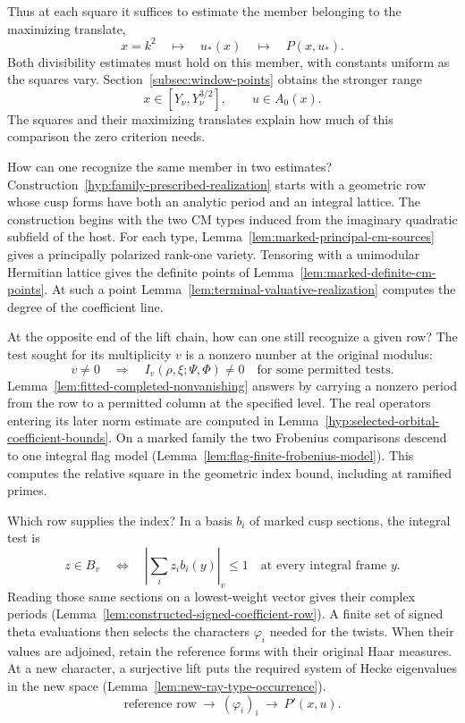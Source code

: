 Thus at each square it suffices to estimate the member belonging
to the maximizing translate,
\[
    x=k^2\quad\longmapsto\quad u_*(x)\quad\longmapsto\quad P(x,u_*).
\]
Both divisibility estimates must hold on this member, with constants
uniform as the squares vary. Section~\ref{subsec:window-points} obtains the stronger range
\[
      x\in[Y_\nu,Y_\nu^{3/2}],\qquad u\in A_0(x).
\]
The squares and their maximizing translates explain how much of this comparison the zero criterion needs.

How can one recognize the same member in two estimates? Construction~\ref{hyp:family-prescribed-realization} starts with a geometric row whose cusp forms have both an analytic period and an integral lattice.
The construction begins with the two CM types induced from the imaginary quadratic subfield of the host. For each type, Lemma~\ref{lem:marked-principal-cm-sources} gives a principally polarized rank-one variety. Tensoring with a unimodular Hermitian lattice gives the definite points of Lemma~\ref{lem:marked-definite-cm-points}. At such a point Lemma~\ref{lem:terminal-valuative-realization} computes the degree of the coefficient line.

At the opposite end of the lift chain, how can one still recognize a
given row? The test sought for its multiplicity \(v\) is a nonzero
number at the original modulus:
\[
   v\ne0\quad\Longrightarrow\quad I_v(\rho,\xi;\Psi,\Phi)\ne0
       \quad\text{for some permitted tests.}
\]
Lemma~\ref{lem:fitted-completed-nonvanishing} answers by
carrying a nonzero period from the row to a permitted column at the
specified level. The real operators entering its later norm estimate
are computed in Lemma~\ref{hyp:selected-orbital-coefficient-bounds}.
On a marked family the two Frobenius comparisons descend to one integral flag model (Lemma~\ref{lem:flag-finite-frobenius-model}). This computes the relative square in the geometric index bound, including at ramified primes.

Which row supplies the index? In a basis \(b_i\) of marked cusp sections, the integral test is
\[
               z\in B_v\quad\Longleftrightarrow\quad
         \left|\sum_i z_i b_i(y)\right|_v\le1
                             \quad\text{at every integral frame }y .
\]
Reading those same sections on a lowest-weight vector gives their complex periods (Lemma~\ref{lem:constructed-signed-coefficient-row}). A finite set of signed theta evaluations then selects the characters \(\varphi_i\) needed for the twists. When their values are adjoined, retain the reference forms with their original Haar measures. At a new character, a surjective lift puts the required system of Hecke eigenvalues in the new space (Lemma~\ref{lem:new-ray-type-occurrence}).
\[
    \text{reference row}\ \longrightarrow\ (\varphi_i)_i
                       \ \longrightarrow\ P'(x,u).
\]

